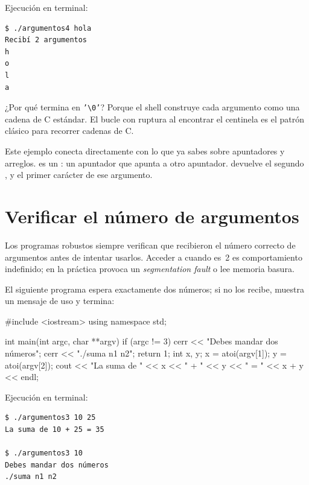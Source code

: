 \documentclass[12pt, oneside]{article}
\begin{document}
Ejecución en terminal:
\begin{verbatim}
$ ./argumentos4 hola
Recibí 2 argumentos
h
o
l
a
\end{verbatim}

¿Por qué termina en \texttt{'\textbackslash{}0'}?  Porque el shell
construye cada argumento como una cadena de C estándar.  El bucle
 con ruptura al encontrar el centinela es el patrón
clásico para recorrer cadenas de C.

\begin{consejo}
  Este ejemplo conecta directamente con lo que ya sabes sobre
  apuntadores y arreglos.   es un : un apuntador
  que apunta a otro apuntador.   devuelve el segundo
  , y  el primer carácter de ese argumento.
\end{consejo}

\section{Verificar el número de argumentos}

Los programas robustos siempre verifican que recibieron el número
correcto de argumentos antes de intentar usarlos.  Acceder a
 cuando  es~2 es comportamiento indefinido;
en la práctica provoca un \textit{segmentation fault} o lee memoria
basura.

El siguiente programa espera exactamente dos números; si no los recibe,
muestra un mensaje de uso y termina:

\begin{codigo}[caption=argumentos3.cpp]
#include <iostream>
using namespace std;

int main(int argc, char **argv){
    if (argc != 3){
        cerr << "Debes mandar dos números\n";
        cerr << "./suma n1 n2\n";
        return 1;
    }
    int x, y;
    x = atoi(argv[1]);
    y = atoi(argv[2]);
    cout << "La suma de " << x << " + " << y << " = " << x + y << endl;
}
\end{codigo}

Ejecución en terminal:
\begin{verbatim}
$ ./argumentos3 10 25
La suma de 10 + 25 = 35

$ ./argumentos3 10
Debes mandar dos números
./suma n1 n2
\end{verbatim}
\end{document}
